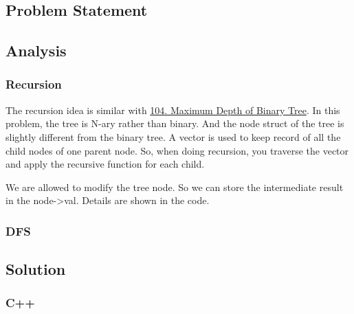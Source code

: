 \documentclass[12pt]{article}
\begin{document}
\subsection{Problem Statement}
\label{sec:org52e2d6f}
\subsection{Analysis}
\label{sec:org58de975}
\subsubsection{Recursion}
\label{sec:orga5b6ca9}
The recursion idea is similar with \hyperref[org1f526b2]{104. Maximum Depth of Binary Tree}. In this problem, the tree is N-ary rather than binary. And the node struct of the tree is slightly different from the binary tree. A vector is used to keep record of all the child nodes of one parent node. So, when doing recursion, you traverse the vector and apply the recursive function for each child.

We are allowed to modify the tree node. So we can store the intermediate result in the node->val. Details are shown in the code.
\subsubsection{DFS}
\label{sec:org6a55b9c}

\subsection{Solution}
\label{sec:org2129e57}
\subsubsection{C++}
\label{sec:org2c3ea43}
\end{document}
